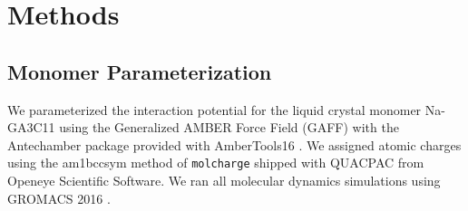 \documentclass[journal=jpcbfk,manuscript=article]{achemso}
\begin{document}
% 
%
%
  

  \section{Methods}
 
  \subsection{Monomer Parameterization}

  We parameterized the interaction potential for the liquid crystal monomer 
  Na-GA3C11 using the Generalized AMBER Force Field (GAFF) 
  \cite{wang_development_2004} with the Antechamber package \cite{wang_automatic_2006} 
  provided with AmberTools16 \cite{case_ambertools16_2016}. We assigned atomic
  charges using the am1bccsym method of \texttt{molcharge} shipped with QUACPAC
  from Openeye Scientific Software. We ran all molecular dynamics simulations 
  using GROMACS 2016 \cite{bekker_gromacs:_1993,berendsen_gromacs:_1995,van_der_spoel_gromacs:_2005,hess_gromacs_2008}.
\end{document}
